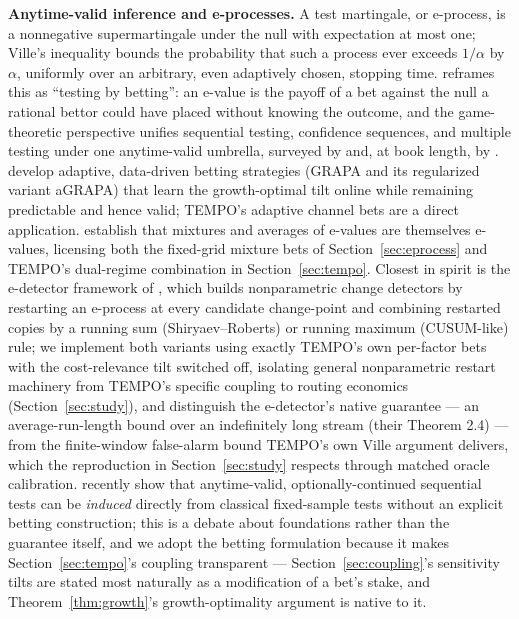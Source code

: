 \documentclass[trsc,dblanonrev]{informs4}
\begin{document}
\textbf{Anytime-valid inference and e-processes.} A test martingale, or
e-process, is a nonnegative supermartingale under the null with
expectation at most one; Ville's inequality \citep{ville1939etude}
bounds the probability that such a process ever exceeds $1/\alpha$ by
$\alpha$, uniformly over an arbitrary, even adaptively chosen, stopping
time. \citet{shafer2021testing} reframes this as ``testing by
betting'': an e-value is the payoff of a bet against the null a
rational bettor could have placed without knowing the outcome, and the
game-theoretic perspective unifies sequential testing, confidence
sequences, and multiple testing under one anytime-valid umbrella,
surveyed by \citet{ramdas2023safi} and, at book length, by
\citet{ramdaswang2025hypothesis}. \citet{waudbysmithramdas2024} develop
adaptive, data-driven betting strategies (GRAPA and its regularized
variant aGRAPA) that learn the growth-optimal tilt online while
remaining predictable and hence valid; TEMPO's adaptive channel bets
are a direct application. \citet{vovkwang2021combining} establish that
mixtures and averages of e-values are themselves e-values, licensing
both the fixed-grid mixture bets of Section~\ref{sec:eprocess} and
TEMPO's dual-regime combination in Section~\ref{sec:tempo}. Closest in
spirit is the e-detector framework of \citet{shin2024edetectors}, which
builds nonparametric change detectors by restarting an e-process at
every candidate change-point and combining restarted copies by a
running sum (Shiryaev--Roberts) or running maximum (CUSUM-like) rule;
we implement both variants using exactly TEMPO's own per-factor bets
with the cost-relevance tilt switched off, isolating general
nonparametric restart machinery from TEMPO's specific coupling to
routing economics (Section~\ref{sec:study}), and distinguish the
e-detector's native guarantee --- an average-run-length bound over an
indefinitely long stream (their Theorem 2.4) --- from the
finite-window false-alarm bound TEMPO's own Ville argument delivers,
which the reproduction in Section~\ref{sec:study} respects through
matched oracle calibration. \citet{koningvanmeer2026} recently show
that anytime-valid, optionally-continued sequential tests can be
\emph{induced} directly from classical fixed-sample tests without an
explicit betting construction; this is a debate about foundations
rather than the guarantee itself, and we adopt the betting formulation
because it makes Section~\ref{sec:tempo}'s coupling transparent ---
Section~\ref{sec:coupling}'s sensitivity tilts are stated most
naturally as a modification of a bet's stake, and
Theorem~\ref{thm:growth}'s growth-optimality argument is native to it.
\end{document}
